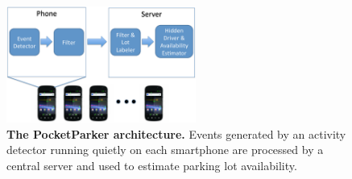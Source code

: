 \begin{figure}
\centering
\includegraphics[height=1.5in]{./figures/blockdiagram.pdf}

\caption{\textbf{The PocketParker architecture.} Events generated by an
activity detector running quietly on each smartphone are processed by a
central server and used to estimate parking lot availability.}

\label{fig-arch}
\end{figure}
